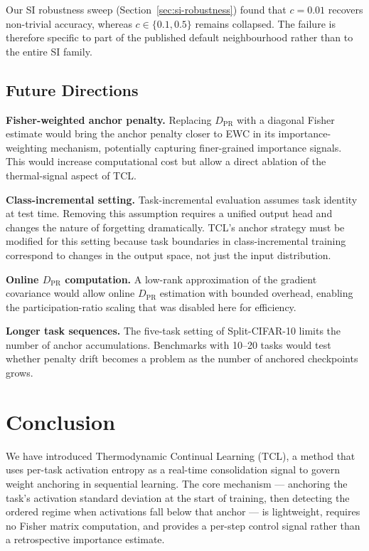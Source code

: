 \documentclass[10pt,a4paper]{article}
\begin{document}
Our SI robustness sweep (Section~\ref{sec:si-robustness}) found that $c = 0.01$
recovers non-trivial accuracy, whereas $c \in \{0.1, 0.5\}$ remains collapsed.
The failure is therefore specific to part of the published default neighbourhood
rather than to the entire SI family.

\subsection{Future Directions}

\textbf{Fisher-weighted anchor penalty.}
Replacing $D_{\mathrm{PR}}$ with a diagonal Fisher estimate would bring the anchor
penalty closer to EWC in its importance-weighting mechanism, potentially capturing
finer-grained importance signals.
This would increase computational cost but allow a direct ablation of the
thermal-signal aspect of TCL.

\textbf{Class-incremental setting.}
Task-incremental evaluation assumes task identity at test time.
Removing this assumption requires a unified output head and changes the nature of
forgetting dramatically.
TCL's anchor strategy must be modified for this setting because task boundaries
in class-incremental training correspond to changes in the output space, not just
the input distribution.

\textbf{Online $D_{\mathrm{PR}}$ computation.}
A low-rank approximation of the gradient covariance would allow online $D_{\mathrm{PR}}$
estimation with bounded overhead, enabling the participation-ratio scaling that was
disabled here for efficiency.

\textbf{Longer task sequences.}
The five-task setting of Split-CIFAR-10 limits the number of anchor accumulations.
Benchmarks with 10--20 tasks would test whether penalty drift becomes a problem as
the number of anchored checkpoints grows.



\section{Conclusion}
\label{sec:conclusion}

We have introduced Thermodynamic Continual Learning (TCL), a method that uses per-task
activation entropy as a real-time consolidation signal to govern weight anchoring in
sequential learning.
The core mechanism --- anchoring the task's activation standard deviation at the start
of training, then detecting the ordered regime when activations fall below that anchor
--- is lightweight, requires no Fisher matrix computation, and provides a per-step
control signal rather than a retrospective importance estimate.
\end{document}
